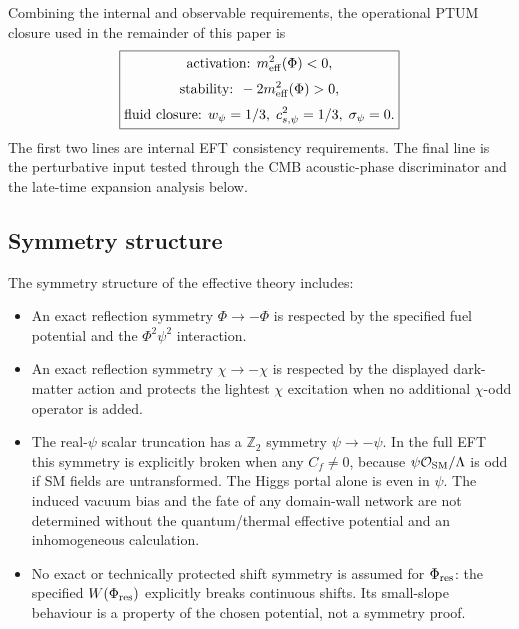 \documentclass[epj]{svjour}
\begin{document}
Combining the internal and observable requirements, the operational PTUM
closure used in the remainder of this paper is
\begin{equation}
\boxed{
\begin{gathered}
\text{activation: } m_{\rm eff}^2(\Phi)<0,\\[2pt]
\text{stability: } -2m_{\rm eff}^2(\Phi)>0,\\[2pt]
\text{fluid closure: } w_\psi=1/3,\; c_{s,\psi}^2=1/3,\; \sigma_\psi=0 .
\end{gathered}}
\label{eq:ptum_operational_closure}
\end{equation}
The first two lines are internal EFT consistency requirements.  The final line
is the perturbative input tested through the CMB acoustic-phase discriminator
and the late-time expansion analysis below.

\subsection{Symmetry structure}

The symmetry structure of the effective theory includes:

\begin{itemize}
\item An exact reflection symmetry \(\Phi\to-\Phi\) is respected by
      the specified fuel potential and the \(\Phi^2\psi^2\) interaction.
\item An exact reflection symmetry \(\chi\to-\chi\) is respected by
      the displayed dark-matter action and protects the lightest
      \(\chi\) excitation when no additional \(\chi\)-odd operator is added.
\item The real-\(\psi\) scalar truncation has a \(\mathbb{Z}_2\)
      symmetry \(\psi\to-\psi\). In the full EFT this symmetry is
      explicitly broken when any \(C_f\ne0\), because
      \(\psi\mathcal O_{\rm SM}/\Lambda\) is odd if SM fields are
      untransformed. The Higgs portal alone is even in \(\psi\).
      The induced vacuum bias and the fate of any domain-wall network
      are not determined without the quantum/thermal effective
      potential and an inhomogeneous calculation.
\item No exact or technically protected shift symmetry is assumed
      for \(\Phi_{\rm res}\): the specified \(W(\Phi_{\rm res})\)
      explicitly breaks continuous shifts. Its small-slope behaviour
      is a property of the chosen potential, not a symmetry proof.
\end{itemize}
\end{document}
